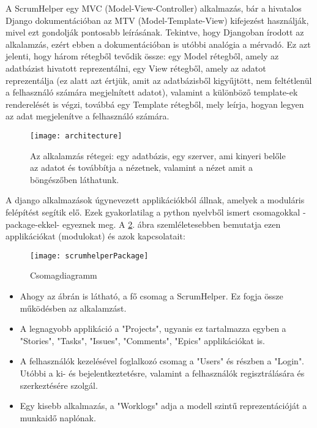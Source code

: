 A ScrumHelper egy MVC (Model-View-Controller) alkalmazás, bár a hivatalos Django dokumentációban az MTV (Model-Template-View) kifejezést használják, mivel ezt gondolják pontosabb leírásának. Tekintve, hogy Djangoban írodott az alkalamzás, ezért ebben a dokumentációban is utóbbi analógia a mérvadó. Ez azt jelenti, hogy három rétegből tevődik össze: egy Model rétegből, amely az adatbázist hivatott reprezentálni, egy View rétegből, amely az adatot reprezentálja (ez alatt azt értjük, amit az adatbázisből kigyűjtött, nem feltétlenül a felhasználó számára megjelnített adatot), valamint a különböző template-ek renderelését is végzi, továbbá egy Template rétegből, mely leírja, hogyan legyen az adat megjelenítve a felhasználó számára.

\begin{figure}[H]
	\centering
	\texttt{[image: architecture]}
	\caption{Az alkalamzás rétegei: egy adatbázis, egy szerver, ami kinyeri belőle az adatot és továbbítja a nézetnek, valamint a nézet amit a böngészőben láthatunk.}
	\label{fig:architecture}
\end{figure}

A django alkalmazások úgynevezett applikációkból állnak, amelyek a moduláris felépítést segítik elő. Ezek gyakorlatilag a python nyelvből ismert csomagokkal -package-ekkel- egyeznek meg. A \ref{fig:packages}. ábra szemléletesebben bemutatja ezen applikációkat (modulokat) és azok kapcsolatait:

\begin{figure}[H]
	\centering
	\texttt{[image: scrumhelperPackage]}
	\caption{Csomagdiagramm}
	\label{fig:packages}
\end{figure}

\pagebreak

\begin{itemize}
 	\item Ahogy az ábrán is látható, a fő csomag a ScrumHelper. Ez fogja össze működésben az alkalamzást.
	\item A legnagyobb applikáció a "Projects", ugyanis ez tartalmazza egyben a "Stories", "Tasks", "Issues", "Comments", "Epics" applikációkat is.
	\item A felhasználók kezelésével foglalkozó csomag a "Users" és részben a "Login". Utóbbi a ki- és bejelentkeztetésre, valamint a felhasználók regisztrálására és szerkeztésére szolgál.
	\item Egy kisebb alkalmazás, a "Worklogs" adja a modell szintű reprezentációját a munkaidő naplónak.
\end{itemize}

